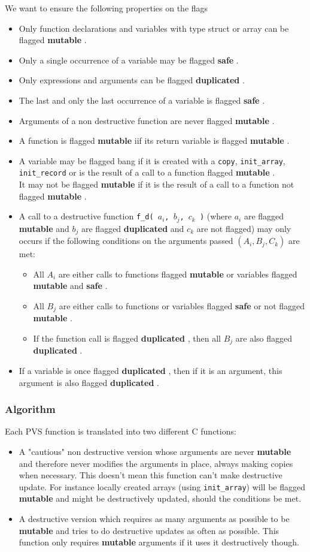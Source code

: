 \documentclass[12pt,a4paper]{article}
\newcommand{\cl}[1]{\texttt{#1}}
\newcommand{\bang}{ \textbf{ mutable } }
\newcommand{\safe}{ \textbf{ safe } }
\newcommand{\dupl}{ \textbf{ duplicated } }
\begin{document}
We want to ensure the following properties on the flags
\begin{itemize}
\item Only function declarations and variables with type struct or array can be flagged \bang.
\item Only a single occurrence of a variable may be flagged \safe.
\item Only expressions and arguments can be flagged \dupl.
\item The last and only the last occurrence of a variable is flagged \safe.
\item Arguments of a non destructive function are never flagged \bang.
\item A function is flagged \bang iif its return variable is flagged \bang.
\item A variable may be flagged bang if it is created with a \cl{copy}, \cl{init\_array}, \cl{init\_record} or is the result of a call to a function flagged \bang.\\
It may not be flagged \bang if it is the result of a call to a function not flagged \bang.
\item A call to a destructive function \cl{f\_d( $a_i$, $b_j$, $c_k$ )} (where $a_i$ are flagged \bang and $b_j$ are flagged \dupl and $c_k$ are not flagged) may only occurs if the following conditions on the arguments passed $( A_i, B_j, C_k )$ are met:
\begin{itemize}
\item All $A_i$ are either calls to functions flagged \bang or variables flagged \bang and \safe.
\item All $B_j$ are either calls to functions or variables flagged \safe or not flagged \bang.
\item If the function call is flagged \dupl, then all $B_j$ are also flagged \dupl.
\end{itemize}
\item If a variable is once flagged \dupl, then if it is an argument, this argument is also flagged \dupl.
\end{itemize}



\subsubsection{Algorithm}

Each PVS function is translated into two different C functions:
\begin{itemize}
\item A "cautious" non destructive version whose arguments are never \bang and therefore never modifies the arguments in place, always making copies when necessary. This doesn't mean this function can't make destructive update. For instance locally created arrays (using \cl{init\_array}) will be flagged \bang and might be destructively updated, should the conditions be met.
\item A destructive version which requires as many arguments as possible to be \bang and tries to do destructive updates as often as possible. This function only requires \bang arguments if it uses it destructively though.
\end{itemize}
\end{document}
